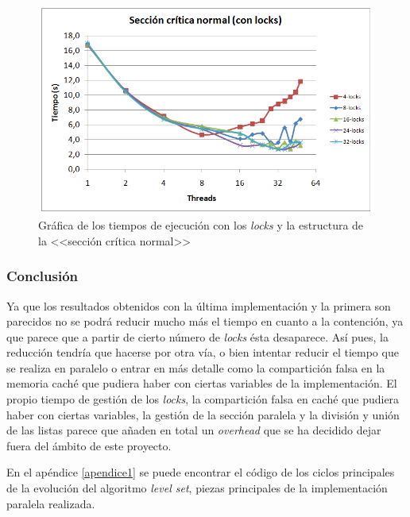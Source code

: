 \begin{figure}[H]
	\captionsetup{justification=centering}
	\centering
	\includegraphics[width=.9\textwidth]{./imagenes/grafico3-2Imple}
	\caption{Gr\'{a}fica de los tiempos de ejecuci\'{o}n con los \textit{locks} y la estructura de la <<secci\'{o}n cr\'{i}tica normal>>}	
	\label{grafico3-2Imple}
\end{figure}


\subsubsection{Conclusi\'{o}n}

Ya que los resultados obtenidos con la \'{u}ltima implementaci\'{o}n y la primera son parecidos no se podr\'{a} reducir mucho m\'{a}s el tiempo en cuanto a la contenci\'{o}n, ya que parece que a partir de cierto n\'{u}mero de \textit{locks} \'{e}sta desaparece. As\'{i} pues, la reducci\'{o}n tendr\'{i}a que hacerse por otra v\'{i}a, o bien intentar reducir el tiempo que se realiza en paralelo o entrar en m\'{a}s detalle como la compartici\'{o}n falsa en la memoria cach\'{e} que pudiera haber con ciertas variables de la implementaci\'{o}n. El propio tiempo de gesti\'{o}n de los \textit{locks}, la compartici\'{o}n falsa en cach\'{e} que pudiera haber con ciertas variables, la gesti\'{o}n de la secci\'{o}n paralela y la divisi\'{o}n y uni\'{o}n de las listas parece que a\~{n}aden en total un \textit{overhead} que se ha decidido dejar fuera del \'{a}mbito de este proyecto. 

En el ap\'{e}ndice \ref{apendice1} se puede encontrar el c\'{o}digo de los ciclos principales de la evoluci\'{o}n del algoritmo \textit{level set}, piezas principales de la implementaci\'{o}n paralela realizada. 